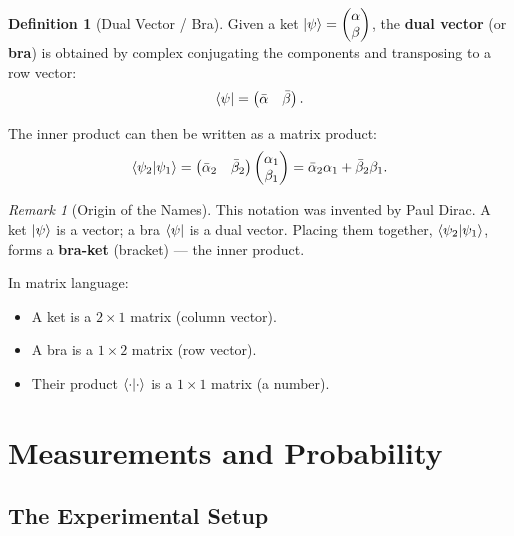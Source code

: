 \documentclass[11pt,a4paper]{article}
\theoremstyle{definition}
\newtheorem{definition}{Definition}[section]
\theoremstyle{plain}
\theoremstyle{remark}
\newtheorem{remark}{Remark}[section]
\begin{document}
\begin{definition}[Dual Vector / Bra]
    Given a ket $\ket{\psi} = \begin{pmatrix} \alpha \\ \beta \end{pmatrix}$, the \textbf{dual vector} (or \textbf{bra}) is obtained by complex conjugating the components and transposing to a row vector:
    \[
        \bra{\psi} = \begin{pmatrix} \bar{\alpha} & \bar{\beta} \end{pmatrix}.
    \]
\end{definition}

The inner product can then be written as a matrix product:
\[
    \braket{\psi_2}{\psi_1} = \begin{pmatrix} \bar{\alpha}_2 & \bar{\beta}_2 \end{pmatrix} \begin{pmatrix} \alpha_1 \\ \beta_1 \end{pmatrix} = \bar{\alpha}_2 \alpha_1 + \bar{\beta}_2 \beta_1.
\]

\begin{remark}[Origin of the Names]
    This notation was invented by Paul Dirac. A ket $\ket{\psi}$ is a vector; a bra $\bra{\psi}$ is a dual vector. Placing them together, $\braket{\psi_2}{\psi_1}$, forms a \textbf{bra-ket} (bracket) --- the inner product.
\end{remark}

In matrix language:
\begin{itemize}
    \item A ket is a $2 \times 1$ matrix (column vector).
    \item A bra is a $1 \times 2$ matrix (row vector).
    \item Their product $\braket{\cdot}{\cdot}$ is a $1 \times 1$ matrix (a number).
\end{itemize}

\section{Measurements and Probability}

\subsection{The Experimental Setup}
\end{document}
